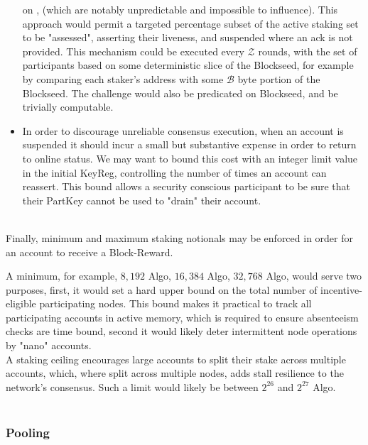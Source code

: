 \documentclass[11pt,a4paper]{article}
\begin{document}
\begin{itemize}
          on , (which are notably unpredictable and impossible to influence). This approach would 
          permit a targeted percentage subset of the active staking set to be "assessed", asserting their liveness, and
          suspended where an ack is not provided. This mechanism could be executed every \(\mathcal{Z}\) rounds, with 
          the set of participants based on some deterministic slice of the \gls{Blockseed}, for example by comparing 
          each staker's address with some \(\mathcal{B}\) byte portion of the \gls{Blockseed}. The challenge would also 
          be predicated on \gls{Blockseed}, and be trivially computable.
    \item In order to discourage unreliable consensus execution, when an account is suspended it should incur a small
          but substantive expense in order to return to online status. We may want to bound this cost with an 
          integer limit value in the initial \gls{KeyReg}, controlling the number of times an account can reassert. This
          bound allows a security conscious participant to be sure that their \gls{PartKey} cannot be used to "drain"
          their account.

\end{itemize} \mbox{} \\

Finally, minimum and maximum staking notionals may be enforced in order for an account to receive a \gls{Block-Reward}.

A minimum, for example, $8,192$ Algo, $16,384$ Algo, $32,768$ Algo, would serve two purposes, first, it would set a hard
upper bound on the total number of incentive-eligible participating nodes. This bound makes it practical to track all 
participating accounts in active memory, which is required to ensure absenteeism checks are time bound, second it would 
likely deter intermittent node operations by "nano" accounts. \\ 

A staking ceiling encourages large accounts to split their stake across multiple accounts, which, where split across
multiple nodes, adds stall resilience to the network's consensus. Such a limit would likely be between $2^{26}$ and
$2^{27}$ Algo. \\ \\

\pagebreak

\subsubsection{Pooling}
\end{document}
